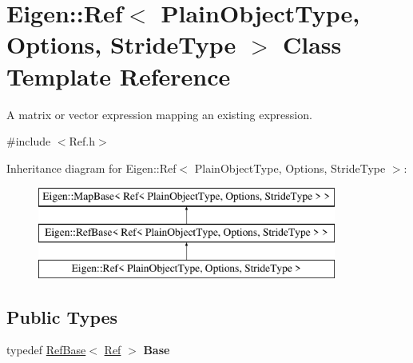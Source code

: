 \hypertarget{class_eigen_1_1_ref}{}\section{Eigen\+::Ref$<$ Plain\+Object\+Type, Options, Stride\+Type $>$ Class Template Reference}
\label{class_eigen_1_1_ref}


A matrix or vector expression mapping an existing expression.  




{\ttfamily \#include $<$Ref.\+h$>$}

Inheritance diagram for Eigen\+::Ref$<$ Plain\+Object\+Type, Options, Stride\+Type $>$\+:\begin{figure}[H]
\begin{center}
\leavevmode
\includegraphics[height=3.000000cm]{class_eigen_1_1_ref}
\end{center}
\end{figure}
\subsection*{Public Types}
\begin{DoxyCompactItemize}
\item 
\mbox{\label{class_eigen_1_1_ref_a6df268d7056480b5377f0295bc6c28ab}} 
typedef \mbox{\hyperlink{class_eigen_1_1_ref_base}{Ref\+Base}}$<$ \mbox{\hyperlink{class_eigen_1_1_ref}{Ref}} $>$ {\bfseries Base}
\end{DoxyCompactItemize}
